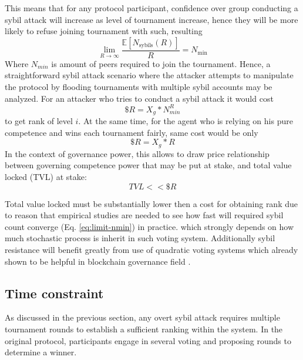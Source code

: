\documentclass{article}
\begin{document}
\begin{CJK}{UTF8}{gbsn}
\begin{multicols}{2}
            This means that for any protocol participant, confidence over group conducting a sybil attack will increase as level of tournament increase, hence they will be more likely to refuse joining tournament with such, resulting
            \begin{equation}
                \lim_{R \to \infty} \frac{\mathbb{E}[N_{\text{sybils}}(R)]}{R} = N_{\text{min}}
                \label{eq:limit-nmin}
            \end{equation} Where $N_{min}$ is amount of peers required to join the tournament. Hence, a straightforward sybil attack scenario where the attacker attempts to manipulate the protocol by flooding tournaments with multiple sybil accounts may be analyzed.
            For an attacker who tries to conduct a sybil attack it would cost
            \begin{equation}
                \$R = X_g*N_{min}^R
            \end{equation}
            to get rank of level $i$. At the same time, for the agent who is relying on his pure competence and wins each tournament fairly, same cost would be only \begin{equation}
                \$R = X_g*R
            \end{equation}
            In the context of governance power, this allows to draw price relationship between governing competence power that may be put at stake, and total value locked (TVL) at stake:
            \begin{equation}
                TVL << \$R
            \end{equation}

            Total value locked must be substantially lower then a cost for obtaining rank due to reason that empirical studies are needed to see how fast will required sybil count converge (Eq. \ref{eq:limit-nmin}) in practice. which strongly depends on how much stochastic process is inherit in such voting system. Additionally sybil resistance will benefit greatly from use of quadratic voting systems which already shown to be helpful in blockchain governance field \cite{Buterin20}\cite{Benhaim2024}.


            \subsection{Time constraint}
            \label{sec:time-constraint}

            As discussed in the previous section, any overt sybil attack requires multiple tournament rounds to establish a sufficient ranking within the system. In the original protocol, participants engage in several voting and proposing rounds to determine a winner.


\end{multicols}
\end{CJK}
\end{document}
